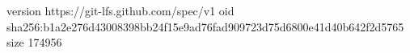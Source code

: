 version https://git-lfs.github.com/spec/v1
oid sha256:b1a2e276d43008398bb24f15e9ad76fad909723d75d6800e41d40b642f2d5765
size 174956
